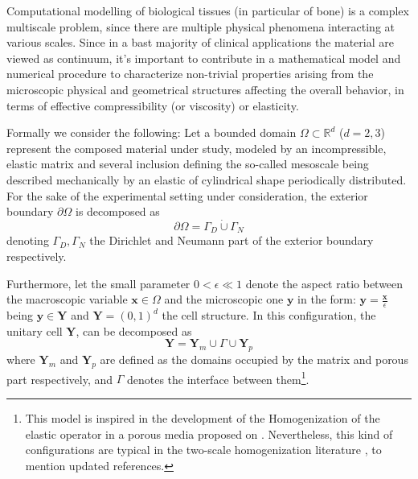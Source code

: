 Computational modelling of biological tissues (in particular of bone) is a complex multiscale problem, since there are multiple physical phenomena interacting at various scales. Since in a bast majority of clinical applications the material are viewed as continuum, it's important to contribute in a mathematical model and numerical procedure to characterize non-trivial properties arising from the microscopic physical and geometrical structures affecting the overall behavior, in terms of effective compressibility (or viscosity) or elasticity. 

Formally we consider the following:
Let a bounded domain $\Omega \subset \mathbb{R}^d$ ($d = 2,3$) represent the composed material under study, modeled by an incompressible, elastic matrix and several inclusion defining the so-called mesoscale being described mechanically by an elastic of cylindrical shape periodically distributed.
For the sake of the experimental setting under consideration, the exterior boundary $\partial \Omega$ is decomposed as
\begin{equation*}
	\partial \Omega = \Gamma_D \dot\cup \Gamma_N
\end{equation*}
denoting $\Gamma_D, \Gamma_N$ the Dirichlet and Neumann part of the exterior boundary respectively.

Furthermore, let the small parameter $0 < \epsilon \ll 1$ denote the aspect ratio between the macroscopic variable $\mathbf{x} \in \Omega$ and the microscopic one $\mathbf{y}$ in the form: $\mathbf{y} = \frac{\mathbf{x}}{\epsilon}$ being $\mathbf{y} \in \mathbf{Y}$ and $\mathbf{Y} = (0,1)^d$ the cell structure. In this configuration, the unitary cell $\mathbf{Y}$, can be decomposed as
\begin{equation*}
	\mathbf{Y} = \mathbf{Y}_m \cup \Gamma \cup \mathbf{Y}_p 
\end{equation*}
where $\mathbf{Y}_m$ and $\mathbf{Y}_p$ are defined as the domains occupied by the matrix and porous part respectively, and $\Gamma$ denotes the interface between them\footnote{This model is inspired in the development of the Homogenization of the elastic operator in a porous media proposed on \cite{christensen1982theory}. Nevertheless, this kind of configurations are typical in the two-scale homogenization literature \cite{panasenko2005multi-scale}, \cite{Boughammoura2013} to mention updated references.}.

